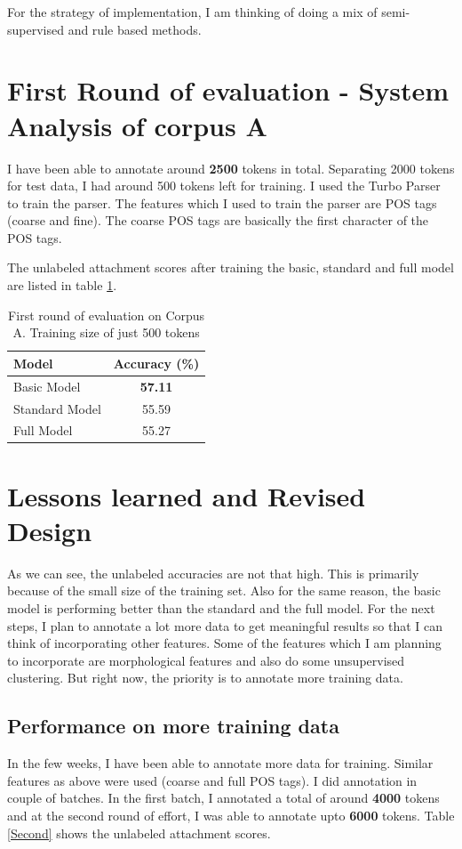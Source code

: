 \documentclass[11pt,letterpaper]{article}
\begin{document}
For the strategy of implementation, I am thinking of doing a  mix of semi-supervised and rule based methods.

\section{First Round of evaluation - System Analysis of corpus A}
I have been able to annotate around \textbf{2500} tokens in total. Separating 2000 tokens for test data, I had around 500 tokens left for training. I used the Turbo Parser \citep{MSXAF10} to train the parser. The features which I used to train the parser are POS tags (coarse and fine). The coarse POS tags are basically the first character of the POS tags. 

 The unlabeled attachment scores after training the basic, standard and full model are listed in table \ref{First}.
\begin{table}
\begin{center}
  \begin{tabular}{ l || c }
  \hline
  Model & Accuracy (\%)\\
  \hline
  Basic Model & \textbf{57.11} \\
  Standard Model & 55.59 \\
  Full Model & 55.27 \\
  \hline
   \end{tabular}
\end{center}
\caption{First round of evaluation on Corpus A. Training size of just 500 tokens}
\label{First}
\end{table}


\section{Lessons learned and Revised Design}
As we can see, the unlabeled accuracies are not that high. This is primarily because of the small size of the training set. Also for the same reason, the basic model is performing better than the standard and the full model. For the next steps, I plan to annotate a lot more data to get meaningful results so that I can think of incorporating other features. Some of the features which I am planning to incorporate are morphological features and also do some unsupervised clustering. But right now, the priority is to annotate more training data.

\subsection{Performance on more training data}
In the few weeks, I have been able to annotate more data for training. Similar features as above were used (coarse and full POS tags). I did annotation in couple of batches. In the first batch, I annotated a total of around \textbf{4000} tokens and at the second round of effort, I was able to annotate upto \textbf{6000} tokens. Table \ref{Second} shows the unlabeled attachment scores. \\
\end{document}
